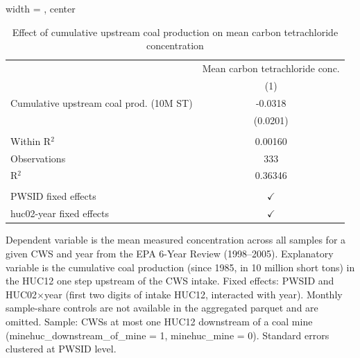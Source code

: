 
\begin{table}[htbp]
   
   \caption{\label{tab:6yr_huc02fe_carbon_tetrachloride_mean} Effect of cumulative upstream coal production on mean carbon tetrachloride concentration}
   \bigskip
   
   \centering
   
   \begin{adjustbox}{width = \textwidth, center}
      
      
      \begin{tabular}{lc}
         \toprule
         
                                                 & Mean carbon tetrachloride conc.\\  
         
                                                 & (1)\\  
         
         \midrule 
         Cumulative upstream coal prod. (10M ST) & -0.0318\\   
                                                 & (0.0201)\\   
         
          \\
         
         Within R$^2$                            & 0.00160\\  
         Observations                            & 333\\  
         R$^2$                                   & 0.36346\\  
         
          \\
         
         PWSID fixed effects                     & $\checkmark$\\   
         huc02-year fixed effects                & $\checkmark$\\   
         
         \bottomrule
         
      \end{tabular}
      
      
      
   \end{adjustbox}
      {\tiny\linespread{1}\selectfont \par \raggedright 
   Dependent variable is the mean measured concentration across all samples for a given CWS and year from the EPA 6-Year Review (1998--2005). Explanatory variable is the cumulative coal production (since 1985, in 10 million short tons) in the HUC12 one step upstream of the CWS intake. Fixed effects: PWSID and HUC02$\times$year (first two digits of intake HUC12, interacted with year). Monthly sample-share controls are not available in the aggregated parquet and are omitted. Sample: CWSs at most one HUC12 downstream of a coal mine (minehuc\_downstream\_of\_mine = 1, minehuc\_mine = 0). Standard errors clustered at PWSID level.}
   
\end{table}


